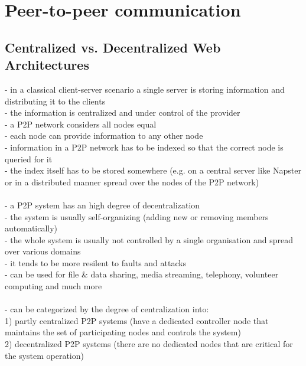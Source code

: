 
\section{Peer-to-peer communication}
\label{sec:p2p_communication}

\subsection{Centralized vs. Decentralized Web Architectures}

- in a classical client-server scenario a single server is storing information and distributing it to the clients \\
- the information is centralized and under control of the provider \\

- a P2P network considers all nodes equal \\
- each node can provide information to any other node \\
- information in a P2P network has to be indexed so that the correct node is queried for it \\
- the index itself has to be stored somewhere (e.g. on a central server like Napster or in a distributed manner spread over the nodes of the P2P network) \\
\\
- a P2P system has an high degree of decentralization \\
- the system is usually self-organizing (adding new or removing members automatically) \\
- the whole system is usually not controlled by a single organisation and spread over various domains \\
- it tends to be more resilent to faults and attacks \\
- can be used for file & data sharing, media streaming, telephony, volunteer computing and much more \\
\\
- can be categorized by the degree of centralization into: \\
  1) partly centralized P2P systems (have a dedicated controller node that maintains the set of participating nodes and controls the system) \\
  2) decentralized P2P systems (there are no dedicated nodes that are critical for the system operation) \\
\\
\label{sec:central_decentral_arch}

